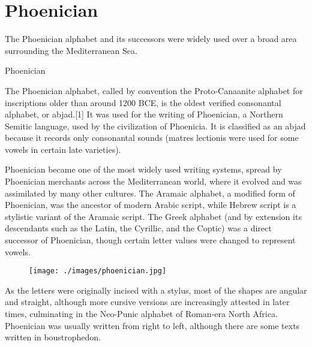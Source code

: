 \section{Phoenician}
\label{s:phoenician}
\arial

The Phoenician alphabet and its successors were widely used over a broad area surrounding the Mediterranean Sea.

\let\phoenician\lycian

\begin{scriptexample}[]{Phoenician}


\end{scriptexample}

The Phoenician alphabet, called by convention the Proto-Canaanite alphabet for inscriptions older than around 1200 BCE, is the oldest verified consonantal alphabet, or abjad.[1] It was used for the writing of Phoenician, a Northern Semitic language, used by the civilization of Phoenicia. It is classified as an abjad because it records only consonantal sounds (matres lectionis were used for some vowels in certain late varieties).

Phoenician became one of the most widely used writing systems, spread by Phoenician merchants across the Mediterranean world, where it evolved and was assimilated by many other cultures. The Aramaic alphabet, a modified form of Phoenician, was the ancestor of modern Arabic script, while Hebrew script is a stylistic variant of the Aramaic script. The Greek alphabet (and by extension its descendants such as the Latin, the Cyrillic, and the Coptic) was a direct successor of Phoenician, though certain letter values were changed to represent vowels.

\begin{figure}[ht]
\texttt{[image: ./images/phoenician.jpg]}
\end{figure}

As the letters were originally incised with a stylus, most of the shapes are angular and straight, although more cursive versions are increasingly attested in later times, culminating in the Neo-Punic alphabet of Roman-era North Africa. Phoenician was usually written from right to left, although there are some texts written in boustrophedon.


\printunicodeblock{./languages/phoenician.txt}{\phoenician}





